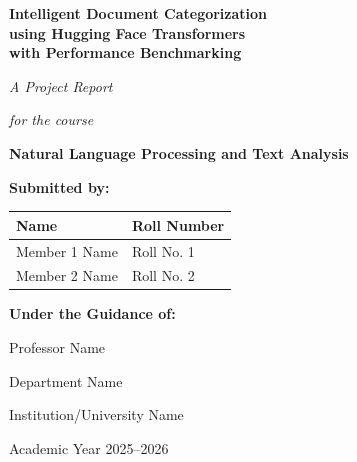 \documentclass[12pt, a4paper]{article}
\begin{document}
\begin{titlepage}
    \centering
    \vspace*{1cm}

    {\LARGE\bfseries Intelligent Document Categorization\\using Hugging Face Transformers\\with Performance Benchmarking\par}

    \vspace{1.5cm}

    {\large\textit{A Project Report}\par}
    {\large\textit{for the course}\par}
    {\large\textbf{Natural Language Processing and Text Analysis}\par}

    \vspace{2cm}

    {\large\textbf{Submitted by:}\par}
    \vspace{0.5cm}
    \begin{tabular}{ll}
        \toprule
        \textbf{Name} & \textbf{Roll Number} \\
        \midrule
        Member 1 Name & Roll No. 1 \\
        Member 2 Name & Roll No. 2 \\
        \bottomrule
    \end{tabular}

    \vspace{2cm}

    {\large\textbf{Under the Guidance of:}\par}
    {\large Professor Name\par}
    {\large Department Name\par}

    \vfill

    {\large Institution/University Name\par}
    \vspace{0.5cm}
    {\large Academic Year 2025--2026\par}
\end{titlepage}

\newpage
\tableofcontents
\newpage
\listoffigures
\listoftables
\newpage

\end{document}
